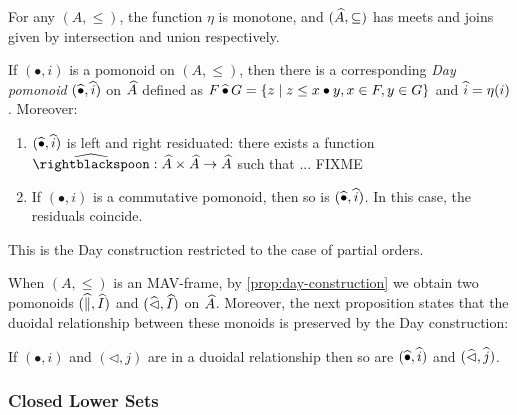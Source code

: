 \begin{proposition}
  For any $(A, \leq)$, the function $\eta$ is monotone, and
  $(\widehat{A}, \subseteq)$ has meets and joins given by
  intersection and union respectively.

\end{proposition}

\begin{proposition}\label{prop:day-construction}
  If $(\bullet, i)$ is a pomonoid on $(A, \leq)$, then there is a
  corresponding \emph{Day pomonoid} $(\mathop{\widehat{\bullet}}, \mathop{\widehat{i}})$ on
  $\widehat{A}$ defined as
  $F \mathop{\widehat{\bullet}} G = \{ z \mid z \leq x \bullet y, x \in F, y \in G
    \}$ and $\mathop{\widehat{i}} = \eta(i)$. Moreover:
  \begin{enumerate}
    \item $(\mathop{\widehat{\bullet}}, \mathop{\widehat{i}})$ is left and right residuated: there
          exists a function
          $\Day{\rightblackspoon} : \LowerSet{A} \times \LowerSet{A} \to
            \LowerSet{A}$ such that ... FIXME
    \item If $(\bullet, i)$ is a commutative pomonoid, then so is
          $(\mathop{\widehat{\bullet}}, \mathop{\widehat{i}})$. In this case, the residuals coincide.
  \end{enumerate}
\end{proposition}

\begin{remark}
  This is the Day construction \cite{day} restricted to the case of
  partial orders.
\end{remark}

\begin{remark}
  When $(A, \leq)$ is an MAV-frame, by \ref{prop:day-construction} we
  obtain two pomonoids $(\mathop{\widehat{\parallel}}, \mathop{\widehat{I}})$ and
  $(\mathop{\widehat{\lhd}}, \mathop{\widehat{I}})$ on $\widehat{A}$. Moreover, the next
  proposition states that the duoidal relationship between these
  monoids is preserved by the Day construction:
\end{remark}

\begin{proposition}\label{prop:lower-set-duoidal}
  If $(\bullet, i)$ and $(\lhd, j)$ are in a duoidal relationship then
  so are $(\mathop{\widehat{\bullet}}, \mathop{\widehat{i}})$ and $(\mathop{\widehat{\lhd}}, \mathop{\widehat{j}})$.
\end{proposition}

\subsubsection{Closed Lower Sets}

